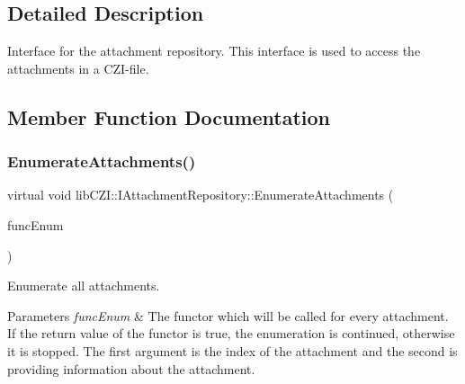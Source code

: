 \subsection{Detailed Description}
Interface for the attachment repository. This interface is used to access the attachments in a C\+Z\+I-\/file. 

\subsection{Member Function Documentation}
\mbox{\label{classlib_c_z_i_1_1_i_attachment_repository_a38f1c13a03e2dd8887d911be2c1b892b}} 
\subsubsection{\texorpdfstring{Enumerate\+Attachments()}{EnumerateAttachments()}}
{\footnotesize\ttfamily virtual void lib\+C\+Z\+I\+::\+I\+Attachment\+Repository\+::\+Enumerate\+Attachments (\begin{DoxyParamCaption}\item[{std\+::function$<$ bool(int index, const \hyperlink{structlib_c_z_i_1_1_attachment_info}{Attachment\+Info} \&info)$>$}]{func\+Enum }\end{DoxyParamCaption})\hspace{0.3cm}{\ttfamily [pure virtual]}}

Enumerate all attachments.


\begin{DoxyParams}{Parameters}
{\em func\+Enum} & The functor which will be called for every attachment. If the return value of the functor is true, the enumeration is continued, otherwise it is stopped. The first argument is the index of the attachment and the second is providing information about the attachment. \\
\hline
\end{DoxyParams}
\mbox{\label{classlib_c_z_i_1_1_i_attachment_repository_acc6b932d8d587bb8399c0236c1c29a55}} 
